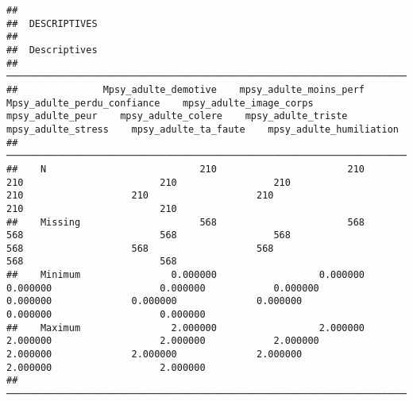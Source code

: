 \documentclass[
]{article}
\begin{document}
\begin{verbatim}
## 
##  DESCRIPTIVES
## 
##  Descriptives                                                                                                                                                                                                                                                     
##  ──────────────────────────────────────────────────────────────────────────────────────────────────────────────────────────────────────────────────────────────────────────────────────────────────────────────────────────────────────────────────────────────── 
##               Mpsy_adulte_demotive    mpsy_adulte_moins_perf    Mpsy_adulte_perdu_confiance    mpsy_adulte_image_corps    mpsy_adulte_peur    mpsy_adulte_colere    mpsy_adulte_triste    mpsy_adulte_stress    mpsy_adulte_ta_faute    mpsy_adulte_humiliation   
##  ──────────────────────────────────────────────────────────────────────────────────────────────────────────────────────────────────────────────────────────────────────────────────────────────────────────────────────────────────────────────────────────────── 
##    N                           210                       210                            210                        210                 210                   210                   210                   210                     210                        210   
##    Missing                     568                       568                            568                        568                 568                   568                   568                   568                     568                        568   
##    Minimum                0.000000                  0.000000                       0.000000                   0.000000            0.000000              0.000000              0.000000              0.000000                0.000000                   0.000000   
##    Maximum                2.000000                  2.000000                       2.000000                   2.000000            2.000000              2.000000              2.000000              2.000000                2.000000                   2.000000   
##  ────────────────────────────────────────────────────────────────────────────────────────────────────────────────────────────────────────────────────────────────────────────────────────────────────────────────────────────────────────────────────────────────
\end{verbatim}
\end{document}

